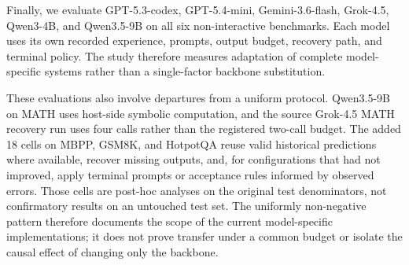 Finally, we evaluate GPT-5.3-codex, GPT-5.4-mini, Gemini-3.6-flash, Grok-4.5, Qwen3-4B, and Qwen3.5-9B on all six non-interactive benchmarks. Each model uses its own recorded experience, prompts, output budget, recovery path, and terminal policy. The study therefore measures adaptation of complete model-specific systems rather than a single-factor backbone substitution.

These evaluations also involve departures from a uniform protocol. Qwen3.5-9B on MATH uses host-side symbolic computation, and the source Grok-4.5 MATH recovery run uses four calls rather than the registered two-call budget. The added 18 cells on MBPP, GSM8K, and HotpotQA reuse valid historical predictions where available, recover missing outputs, and, for configurations that had not improved, apply terminal prompts or acceptance rules informed by observed errors. Those cells are post-hoc analyses on the original test denominators, not confirmatory results on an untouched test set. The uniformly non-negative pattern therefore documents the scope of the current model-specific implementations; it does not prove transfer under a common budget or isolate the causal effect of changing only the backbone.
